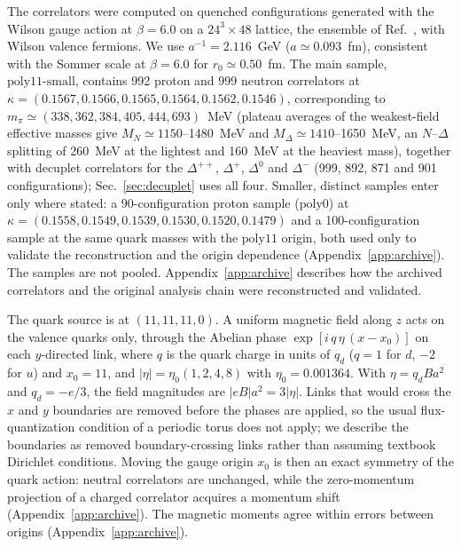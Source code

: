 \documentclass[aps,prd,preprint,nofootinbib,floatfix]{revtex4-2}
\begin{document}
The correlators were computed on quenched configurations generated with the Wilson gauge action at $\beta=6.0$ on a $24^3\times48$ lattice, the ensemble of Ref.~\cite{AlexandruLee2010}, with Wilson valence fermions. We use $a^{-1}=2.116$~GeV ($a\simeq0.093$~fm), consistent with the Sommer scale at $\beta=6.0$ \cite{NeccoSommer2002} for $r_0\simeq0.50$~fm. The main sample, $\mathrm{poly11\mbox{-}small}$, contains 992 proton and 999 neutron correlators at $\kappa=(0.1567,\allowbreak 0.1566,\allowbreak 0.1565,\allowbreak 0.1564,\allowbreak 0.1562,\allowbreak 0.1546)$, corresponding to $m_\pi\simeq(338,\allowbreak 362,\allowbreak 384,\allowbreak 405,\allowbreak 444,\allowbreak 693)$~MeV (plateau averages of the weakest-field effective masses give $M_N\simeq1150$--1480~MeV and $M_\Delta\simeq1410$--1650~MeV, an $N$--$\Delta$ splitting of 260~MeV at the lightest and 160~MeV at the heaviest mass), together with decuplet correlators for the $\Delta^{++}$, $\Delta^+$, $\Delta^0$ and $\Delta^-$ (999, 892, 871 and 901 configurations); Sec.~\ref{sec:decuplet} uses all four. Smaller, distinct samples enter only where stated: a 90-configuration proton sample ($\mathrm{poly0}$) at $\kappa=(0.1558,\allowbreak 0.1549,\allowbreak 0.1539,\allowbreak 0.1530,\allowbreak 0.1520,\allowbreak 0.1479)$ and a 100-configuration sample at the same quark masses with the $\mathrm{poly11}$ origin, both used only to validate the reconstruction and the origin dependence (Appendix~\ref{app:archive}). The samples are not pooled. Appendix~\ref{app:archive} describes how the archived correlators and the original analysis chain were reconstructed and validated.

The quark source is at $(11,11,11,0)$. A uniform magnetic field along $z$ acts on the valence quarks only, through the Abelian phase $\exp[i\,q\,\eta\,(x-x_0)]$ on each $y$-directed link, where $q$ is the quark charge in units of $q_d$ ($q=1$ for $d$, $-2$ for $u$) and $x_0=11$, and $|\eta|=\eta_0(1,2,4,8)$ with $\eta_0=0.001364$. With $\eta=q_dBa^2$ and $q_d=-e/3$, the field magnitudes are $|eB|a^2=3|\eta|$. Links that would cross the $x$ and $y$ boundaries are removed before the phases are applied, so the usual flux-quantization condition of a periodic torus does not apply; we describe the boundaries as removed boundary-crossing links rather than assuming textbook Dirichlet conditions. Moving the gauge origin $x_0$ is then an exact symmetry of the quark action: neutral correlators are unchanged, while the zero-momentum projection of a charged correlator acquires a momentum shift (Appendix~\ref{app:archive}). The magnetic moments agree within errors between origins (Appendix~\ref{app:archive}).
\end{document}
